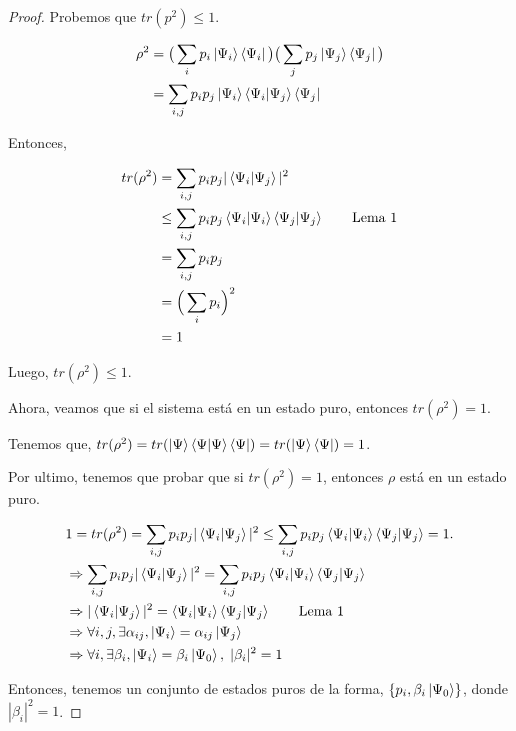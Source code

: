 \documentclass[a4paper,11pt]{article}
\begin{document}
\begin{proof}

Probemos que $tr(p^2) \leq 1$.


\begin{align*}
  \rho^2 
  &= \big( \sum_{i} p_i \left\vert{\Psi_i}\right\rangle\left\langle{\Psi_i}\right\vert \big) \big( \sum_{j} p_j \left\vert{\Psi_j}\right\rangle\left\langle{\Psi_j}\right\vert \big) 
  \\ &=\sum_{i, j} p_i p_j\left\vert{\Psi_i}\right\rangle\braket{\Psi_i | \Psi_j}\left\langle{\Psi_j}\right\vert
 \end{align*}


Entonces, 

\begin{align*}
  tr(\rho^2) 
  &= \sum_{i, j} p_i p_j|\braket{\Psi_i | \Psi_j}|^2
  \\ &\le \sum_{i, j} p_i p_j \braket{\Psi_i | \Psi_i} \braket{\Psi_j | \Psi_j}
       \tag*{Lema 1}
  \\ &= \sum_{i,j} p_ip_j 
  \\ &= \Big( \sum_{i}p_i \Big)^2 
  \\ &= 1 
\end{align*}

Luego, $tr(\rho^2) \le 1$.

Ahora, veamos que si el sistema está en un estado puro, entonces $tr(\rho^2) = 1$.

Tenemos que, $tr(\rho^2) = tr(\left\vert{\Psi}\right\rangle\braket{\Psi | \Psi}\left\langle{\Psi}\right\vert) = tr(\left\vert{\Psi}\right\rangle\left\langle{\Psi}\right\vert) = 1$.

Por ultimo, tenemos que probar que si $tr(\rho^2) = 1$, entonces $\rho$ está en un estado puro.

\begin{align*}
  & 1 = tr(\rho^2) = \sum_{i, j} p_i p_j|\braket{\Psi_i | \Psi_j}|^2 
  \le \sum_{i, j} p_i p_j \braket{\Psi_i | \Psi_i} \braket{\Psi_j | \Psi_j} = 1.
  \\ &\Rightarrow 
       \sum_{i, j} p_i p_j|\braket{\Psi_i | \Psi_j}|^2 = \sum_{i, j} p_i p_j \braket{\Psi_i | \Psi_i} \braket{\Psi_j | \Psi_j}
  \\ &\Rightarrow |\braket{\Psi_i | \Psi_j}|^2 = \braket{\Psi_i | \Psi_i} \braket{\Psi_j | \Psi_j} \tag*{Lema 1}
  \\ &\Rightarrow \forall i, j, \exists \alpha_{ij}, \left\vert{ \Psi_{i}}\right\rangle = \alpha_{ij} \left\vert{\Psi_{j}}\right\rangle
  \\ &\Rightarrow \forall i, \exists \beta_{i}, \left\vert{ \Psi_{i}}\right\rangle = \beta_{i} \left\vert{\Psi_{0}}\right\rangle, \; | \beta_{i}|^2 = 1
\end{align*}

Entonces, tenemos un conjunto de estados puros de la forma, $\{ p_{i}, \beta_{i} \left\vert{\Psi_{0}}\right\rangle\}$, donde $| \beta_{i}|^2 = 1$.


\end{proof}
\end{document}
